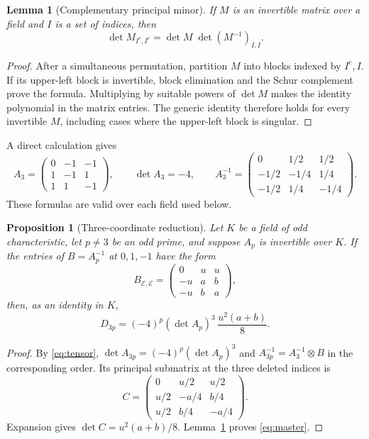 \documentclass[11pt,a4paper]{article}
\newtheorem{lemma}[theorem]{Lemma}
\newtheorem{proposition}[theorem]{Proposition}
\theoremstyle{remark}
\begin{document}
\begin{lemma}[Complementary principal minor]\label{lem:complement}
If \(M\) is an invertible matrix over a field and \(I\) is a set of
indices, then
\[
\det M_{I^c,I^c}=\det M\;\det(M^{-1})_{I,I}.
\]
\end{lemma}
\begin{proof}
After a simultaneous permutation, partition \(M\) into blocks indexed
by \(I^c,I\). If its upper-left block is invertible, block elimination
and the Schur complement prove the formula. Multiplying by suitable
powers of \(\det M\) makes the identity polynomial in the matrix
entries. The generic identity therefore holds for every invertible
\(M\), including cases where the upper-left block is singular.
\end{proof}

A direct calculation gives
\begin{equation}\label{eq:A3}
A_3=
\begin{pmatrix}
0&-1&-1\\
1&-1&1\\
1&1&-1
\end{pmatrix},
\qquad
\det A_3=-4,\qquad
A_3^{-1}=
\begin{pmatrix}
0&1/2&1/2\\
-1/2&-1/4&1/4\\
-1/2&1/4&-1/4
\end{pmatrix}.
\end{equation}
These formulas are valid over each field used below.

\begin{proposition}[Three-coordinate reduction]\label{prop:minor}
Let \(K\) be a field of odd characteristic, let \(p\ne3\) be an odd prime, and suppose
\(A_p\) is invertible over \(K\). If the entries of \(B=A_p^{-1}\)
at \(0,1,-1\) have the form
\begin{equation}\label{eq:Bsmall}
B_{\mathcal E,\mathcal E}
=
\begin{pmatrix}
0&u&u\\
-u&a&b\\
-u&b&a
\end{pmatrix},
\end{equation}
then, as an identity in \(K\),
\begin{equation}\label{eq:master}
D_{3p}=(-4)^p(\det A_p)^3\,
\frac{u^2(a+b)}8.
\end{equation}
\end{proposition}
\begin{proof}
By \eqref{eq:tensor},
\(\det A_{3p}=(-4)^p(\det A_p)^3\) and
\(A_{3p}^{-1}=A_3^{-1}\otimes B\) in the corresponding order.
Its principal submatrix at the three deleted indices is
\[
C=
\begin{pmatrix}
0&u/2&u/2\\
u/2&-a/4&b/4\\
u/2&b/4&-a/4
\end{pmatrix}.
\]
Expansion gives \(\det C=u^2(a+b)/8\).
Lemma~\ref{lem:complement} proves \eqref{eq:master}.
\end{proof}
\end{document}
